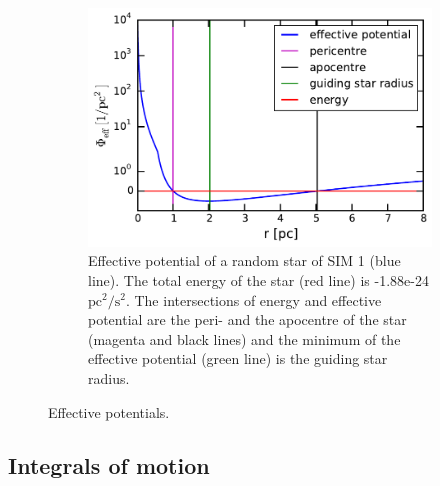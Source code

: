 \begin{figure}[htbp]
\begin{subfigure}{0.475\textwidth}
	\includegraphics[width=\textwidth]{Plots/pot_eff_theory_part.pdf}
	\caption{Effective potential of a random star of SIM 1 (blue line). The total energy of the star (red line) is -1.88e-24 \(\mathrm{pc}^2/\mathrm{s}^2\). The intersections of energy and effective potential are the peri- and the apocentre of the star (magenta and black lines) and the minimum of the effective potential (green line) is the guiding star radius.}
	\label{pot_eff_theory_part}
	\end{subfigure}
\caption{Effective potentials.}
\label{fig:pot_eff_theory}
\end{figure}
\subsection{Integrals of motion}\label{int_of_motion_theory}
